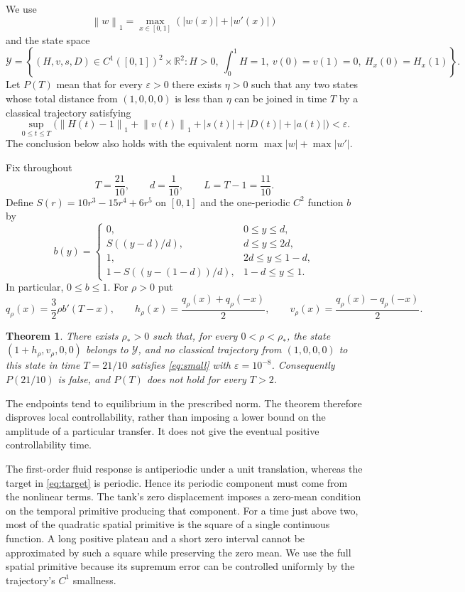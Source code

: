 \documentclass[11pt]{article}
\newtheorem{theorem}{Theorem}
\newcommand{\norm}[1]{\left\|#1\right\|}
\begin{document}
We use
\[
\norm{w}_1=\max_{x\in[0,1]}(|w(x)|+|w'(x)|)
\]
and the state space
\[
\mathcal Y=\left\{(H,v,s,D)\in C^1([0,1])^2\times\mathbb R^2:
 H>0,\ \int_0^1H=1,\ v(0)=v(1)=0,\ H_x(0)=H_x(1)\right\}.
\]
Let $P(T)$ mean that for every $\varepsilon>0$ there exists $\eta>0$ such
that any two states whose total distance from $(1,0,0,0)$ is less than $\eta$
can be joined in time $T$ by a classical trajectory satisfying
\begin{equation}\label{eq:small}
\sup_{0\le t\le T}
\bigl(\norm{H(t)-1}_1+\norm{v(t)}_1+|s(t)|+|D(t)|+|a(t)|\bigr)
<\varepsilon.
\end{equation}
The conclusion below also holds with the equivalent norm
$\max|w|+\max|w'|$.

Fix throughout
\[
T=\frac{21}{10},\qquad d=\frac1{10},\qquad L=T-1=\frac{11}{10}.
\]
Define $S(r)=10r^3-15r^4+6r^5$ on $[0,1]$ and the one-periodic $C^2$
function $b$ by
\begin{equation}\label{eq:b}
b(y)=\begin{cases}
0,&0\le y\le d,\\
S((y-d)/d),&d\le y\le2d,\\
1,&2d\le y\le1-d,\\
1-S((y-(1-d))/d),&1-d\le y\le1.
\end{cases}
\end{equation}
In particular, $0\le b\le1$. For $\rho>0$ put
\begin{equation}\label{eq:target}
q_\rho(x)=\frac32\rho b'(T-x),\qquad
h_\rho(x)=\frac{q_\rho(x)+q_\rho(-x)}2,\qquad
v_\rho(x)=\frac{q_\rho(x)-q_\rho(-x)}2.
\end{equation}

\begin{theorem}\label{thm:main}
There exists $\rho_*>0$ such that, for every $0<\rho<\rho_*$, the state
$(1+h_\rho,v_\rho,0,0)$ belongs to $\mathcal Y$, and no classical trajectory
from $(1,0,0,0)$ to this state in time $T=21/10$ satisfies
\eqref{eq:small} with $\varepsilon=10^{-8}$. Consequently $P(21/10)$ is
false, and $P(T)$ does not hold for every $T>2$.
\end{theorem}

The endpoints tend to equilibrium in the prescribed norm. The theorem
therefore disproves local controllability, rather than imposing a lower bound
on the amplitude of a particular transfer. It does not give the eventual
positive controllability time.

The first-order fluid response is antiperiodic under a unit translation,
whereas the target in \eqref{eq:target} is periodic. Hence its periodic
component must come from the nonlinear terms. The tank's zero displacement
imposes a zero-mean condition on the temporal primitive producing that
component. For a time just above two, most of the quadratic spatial primitive
is the square of a single continuous function. A long positive plateau and a
short zero interval cannot be approximated by such a square while preserving
the zero mean. We use the full spatial primitive because its supremum error
can be controlled uniformly by the trajectory's $C^1$ smallness.
\end{document}
